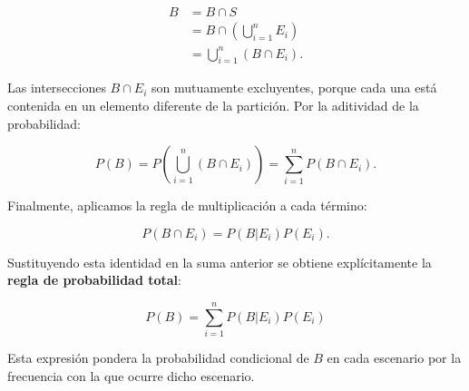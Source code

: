\begin{align*}
B
    &= B\cap S\\
    &= B\cap\left(\bigcup_{i=1}^{n}E_i\right)\\
    &= \bigcup_{i=1}^{n}(B\cap E_i).
\end{align*}

Las intersecciones $B\cap E_i$ son mutuamente excluyentes, porque cada una está contenida en un elemento diferente de la partición. Por la aditividad de la probabilidad:

$$ P(B)=P\left(\bigcup_{i=1}^{n}(B\cap E_i)\right)
=\sum_{i=1}^{n}P(B\cap E_i). $$

Finalmente, aplicamos la regla de multiplicación a cada término:

$$ P(B\cap E_i)=P(B|E_i)P(E_i). $$

Sustituyendo esta identidad en la suma anterior se obtiene explícitamente la \textbf{regla de probabilidad total}:

$$ \boxed{P(B)=\sum_{i=1}^{n}P(B|E_i)P(E_i)} $$

Esta expresión pondera la probabilidad condicional de $B$ en cada escenario por la frecuencia con la que ocurre dicho escenario.

